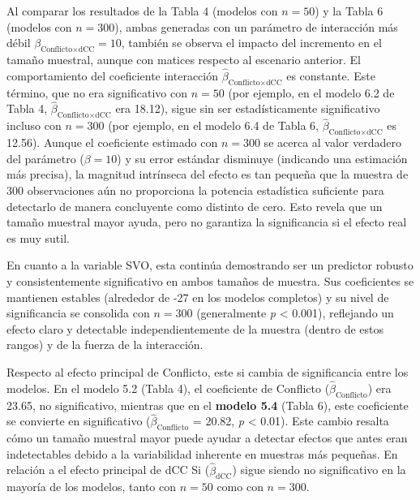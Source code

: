 \documentclass[
  spanish,
  10pt,
]{article}
\begin{document}
Al comparar los resultados de la Tabla 4 (modelos con \(n=50\)) y la
Tabla 6 (modelos con \(n=300\)), ambas generadas con un parámetro de
interacción más débil \(\beta_{\text{Conflicto} \times \text{dCC}}=10\),
también se observa el impacto del incremento en el tamaño muestral,
aunque con matices respecto al escenario anterior. El comportamiento del
coeficiente interacción
\(\hat{\beta}_{\text{Conflicto} \times \text{dCC}}\) es constante. Este
término, que no era significativo con \(n=50\) (por ejemplo, en el
modelo 6.2 de Tabla 4,
\(\hat{\beta}_{\text{Conflicto} \times \text{dCC}}\) era 18.12), sigue
sin ser estadísticamente significativo incluso con \(n=300\) (por
ejemplo, en el modelo 6.4 de Tabla 6,
\(\hat{\beta}_{\text{Conflicto} \times \text{dCC}}\) es 12.56). Aunque
el coeficiente estimado con \(n=300\) se acerca al valor verdadero del
parámetro (\(\beta=10\)) y su error estándar disminuye (indicando una
estimación más precisa), la magnitud intrínseca del efecto es tan
pequeña que la muestra de 300 observaciones aún no proporciona la
potencia estadística suficiente para detectarlo de manera concluyente
como distinto de cero. Esto revela que un tamaño muestral mayor ayuda,
pero no garantiza la significancia si el efecto real es muy sutil.

En cuanto a la variable SVO, esta continúa demostrando ser un predictor
robusto y consistentemente significativo en ambos tamaños de muestra.
Sus coeficientes se mantienen estables (alrededor de -27 en los modelos
completos) y su nivel de significancia se consolida con \(n=300\)
(generalmente \emph{p} \textless{} 0.001), reflejando un efecto claro y
detectable independientemente de la muestra (dentro de estos rangos) y
de la fuerza de la interacción.

Respecto al efecto principal de Conflicto, este si cambia de
significancia entre los modelos. En el modelo 5.2 (Tabla 4), el
coeficiente de Conflicto (\(\hat{\beta}_{\text{Conflicto}}\)) era 23.65,
no significativo, mientras que en el \textbf{modelo 5.4} (Tabla 6), este
coeficiente se convierte en significativo
(\(\hat{\beta}_{\text{Conflicto}}\) = 20.82, \emph{p} \textless{} 0.01).
Este cambio resalta cómo un tamaño muestral mayor puede ayudar a
detectar efectos que antes eran indetectables debido a la variabilidad
inherente en muestras más pequeñas. En relación a el efecto principal de
dCC Si (\(\hat{\beta}_{\text{dCC}}\)) sigue siendo no significativo en
la mayoría de los modelos, tanto con \(n=50\) como con \(n=300\).
\end{document}
